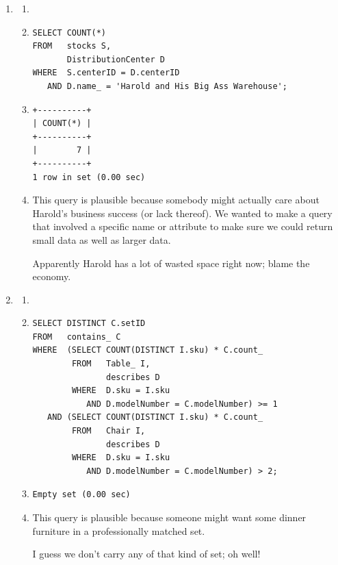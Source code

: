 \documentclass[american,extrafontsizes,12pt,portrait,letterpaper,oneside,onecolumn,final]{memoir}
\begin{document}
\begin{enumerate}[leftmargin=*,label={\strong{\uline{(\emph{\Alph*})}}}]
\item
\begin{enumerate}[leftmargin=*,widest={\strong{Explanation:}}]
\item[\strong{Intent:}] 
\item[\strong{Query:}]
\begin{verbatim}
SELECT COUNT(*)
FROM   stocks S,
       DistributionCenter D
WHERE  S.centerID = D.centerID
   AND D.name_ = 'Harold and His Big Ass Warehouse';
\end{verbatim}
\item[\strong{Result:}]
\begin{verbatim}
+----------+
| COUNT(*) |
+----------+
|        7 |
+----------+
1 row in set (0.00 sec)
\end{verbatim}
\item[\strong{Explanation:}] This query is plausible because somebody might actually care about Harold's business success (or lack thereof).
We wanted to make a query that involved a specific name or attribute to make sure we could return small data as well as larger data.

Apparently Harold has a lot of wasted space right now; blame the economy.
\end{enumerate}

\item
\begin{enumerate}[leftmargin=*,widest={\strong{Explanation:}}]
\item[\strong{Intent:}] 
\item[\strong{Query:}]
\begin{verbatim}
SELECT DISTINCT C.setID
FROM   contains_ C
WHERE  (SELECT COUNT(DISTINCT I.sku) * C.count_
        FROM   Table_ I,
               describes D
        WHERE  D.sku = I.sku
           AND D.modelNumber = C.modelNumber) >= 1
   AND (SELECT COUNT(DISTINCT I.sku) * C.count_
        FROM   Chair I,
               describes D
        WHERE  D.sku = I.sku
           AND D.modelNumber = C.modelNumber) > 2;
\end{verbatim}
\item[\strong{Result:}]
\begin{verbatim}
Empty set (0.00 sec)
\end{verbatim}
\item[\strong{Explanation:}] This query is plausible because someone might want some dinner furniture in a professionally matched set.

I guess we don't carry any of that kind of set; oh well!
\end{enumerate}

\end{enumerate}
\end{document}
